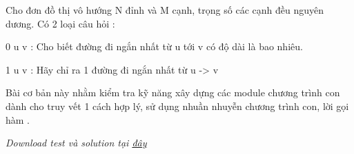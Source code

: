 Cho đơn đồ thị vô hướng N đỉnh và M cạnh, trọng số các cạnh đều nguyên dương. Có 2 loại câu hỏi :   


   0 u v : Cho biết đường đi ngắn nhất từ u tới v có độ dài là bao nhiêu.   


   1 u v : Hãy chỉ ra 1 đường đi ngắn nhất từ u -> v   


   Bài cơ bản này nhằm kiểm tra kỹ năng xây dựng các module chương trình con dành cho truy vết 1 cách hợp lý, sử dụng nhuần nhuyễn chương trình con, lời gọi hàm .   





\textit{    Download test và solution tại    \href{http://vn.spoj.pl/content/floyd.rar}{     đây    }}